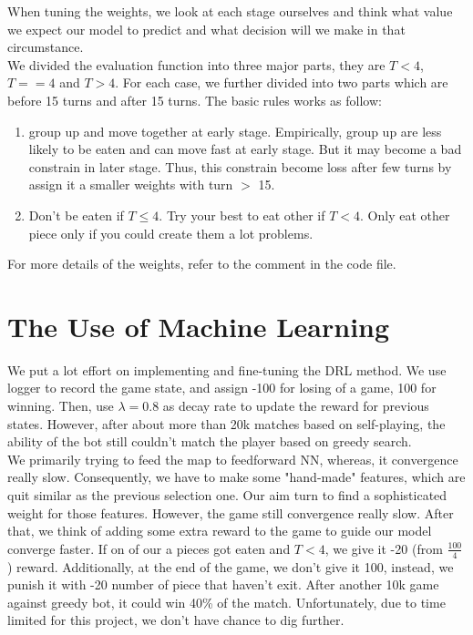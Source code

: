 \documentclass[11pt]{article}
\begin{document}
When tuning the weights, we look at each stage ourselves and think what value we expect our model 
to predict and what decision will we make in that circumstance.
\\
We divided the evaluation function into three major parts, they are $T<4$, $T==4$ and $T>4$. For each case, we further
divided into two parts which are before 15 turns and after 15 turns. The basic rules works as follow:

\begin{enumerate}
  \item group up and move together at early stage. Empirically, group up are less likely to be eaten and can move fast
        at early stage. But it may become a bad constrain in later stage. Thus, this constrain become loss 
        after few turns by assign it a smaller weights with turn $>$ 15.
  \item Don't be eaten if $T \leq 4$. Try your best to eat other if $T < 4$. Only eat other piece only if you could
        create them a lot problems.
\end{enumerate}

For more details of the weights, refer to the comment in the code file.

\section{The Use of Machine Learning}
We put a lot effort on implementing and fine-tuning the DRL method. We use logger to 
record the game state, and assign -100 for losing of a game, 100 for winning. Then, use $\lambda=0.8$ as decay rate
to update the reward for previous states.
However, after about more than 20k matches based on self-playing, the ability of the bot still couldn't 
match the player based on greedy search.
\\
We primarily trying to feed the map to feedforward NN, whereas, it convergence really slow. Consequently, we have to
make some "hand-made" features, which are quit similar as the previous selection one. Our aim turn to find a 
sophisticated weight for those features. However, the game still convergence really slow. After that, we think of adding
some extra reward to the game to guide our model converge faster. If on of our a pieces got eaten and $T < 4$, we give it
-20 (from $\frac{100}{4}$) reward. Additionally, at the end of the game, we don't give it 100, instead, we punish it 
with -20 \* number of piece that haven't exit. After another 10k game against greedy bot, it could win 40\% of the match.
Unfortunately, due to time limited for this project, we don't have chance to dig further.
\end{document}
